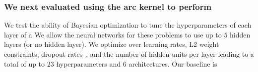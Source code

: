 \documentclass[12pt,onlymath]{beamer}
\begin{document}
\begin{frame}\frametitle{We next evaluated using the arc kernel to perform }
We test the ability of Bayesian optimization to tune the hyperparameters of each layer of a 
\vfill
We allow the neural networks for these problems to use up to $5$ hidden layers (or no hidden layer).
\vfill
We optimize over learning rates, L2 weight constraints, dropout rates~\cite{hinton2012improving}, and the number of hidden units per layer leading to a total of up to $23$ hyperparameters and $6$ architectures.
\vfill
Our baseline is 
\end{frame}
\end{document}
